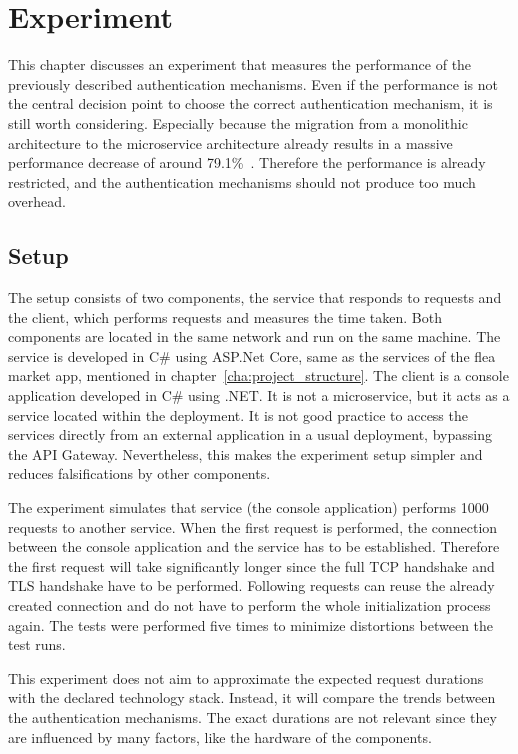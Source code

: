 \chapter{Experiment}
\label{cha:experiment}
This chapter discusses an experiment that measures the performance of the previously described authentication mechanisms.
Even if the performance is not the central decision point to choose the correct authentication mechanism, it is still worth considering.
Especially because the migration from a monolithic architecture to the microservice architecture already results in a massive performance decrease of around 79.1\%~\cite{ueda2016workload}.
Therefore the performance is already restricted, and the authentication mechanisms should not produce too much overhead.

\section{Setup}
The setup consists of two components, the service that responds to requests and the client, which performs requests and measures the time taken.
Both components are located in the same network and run on the same machine.
The service is developed in C\# using ASP.Net Core, same as the services of the flea market app, mentioned in chapter~\ref{cha:project_structure}.
The client is a console application developed in C\# using .NET.
It is not a microservice, but it acts as a service located within the deployment.
It is not good practice to access the services directly from an external application in a usual deployment, bypassing the API Gateway.
Nevertheless, this makes the experiment setup simpler and reduces falsifications by other components. 

The experiment simulates that service (the console application) performs 1000 requests to another service.
When the first request is performed, the connection between the console application and the service has to be established.
Therefore the first request will take significantly longer since the full TCP handshake and TLS handshake have to be performed.
Following requests can reuse the already created connection and do not have to perform the whole initialization process again.
The tests were performed five times to minimize distortions between the test runs.

This experiment does not aim to approximate the expected request durations with the declared technology stack.
Instead, it will compare the trends between the authentication mechanisms.
The exact durations are not relevant since they are influenced by many factors, like the hardware of the components.

